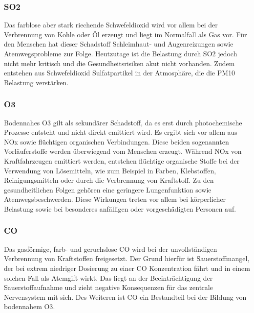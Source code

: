 \subsubsection{\acs{SO2}}
Das farblose aber stark riechende Schwefeldioxid wird vor allem bei der Verbrennung von Kohle oder Öl erzeugt und liegt im Normalfall als Gas vor. 
\newline
Für den Menschen hat dieser Schadstoff Schleimhaut- und Augenreizungen sowie Atemwegsprobleme zur Folge. 
\newline
Heutzutage ist die Belastung durch SO2 jedoch nicht mehr kritisch und die Gesundheitsrisiken akut nicht vorhanden.
\newline
Zudem entstehen aus Schwefeldioxid Sulfatpartikel in der Atmosphäre, die die PM10 Belastung verstärken. 

\subsubsection{\acs{O3}}
Bodennahes \acs{O3} gilt als sekundärer Schadstoff, da es erst durch photochemische Prozesse entsteht und nicht direkt emittiert wird. Es ergibt sich vor allem aus \acs{NOx} sowie flüchtigen organischen Verbindungen. Diese beiden sogenannten Vorläuferstoffe werden überwiegend vom Menschen erzeugt. Während \acs{NOx} von Kraftfahrzeugen emittiert werden, entstehen flüchtige organische Stoffe bei der Verwendung von Lösemitteln, wie zum Beispiel in Farben, Klebstoffen, Reinigungsmitteln oder durch die Verbrennung von Kraftstoff. 
\newline
Zu den gesundheitlichen Folgen gehören eine geringere Lungenfunktion sowie Atemwegsbeschwerden. Diese Wirkungen treten vor allem bei körperlicher Belastung sowie bei besonderes anfälligen oder vorgeschädigten Personen auf. 

\subsubsection{\acs{CO}}
Das gasförmige, farb- und geruchslose \acs{CO} wird bei der unvollständigen Verbrennung von Kraftstoffen freigesetzt. Der Grund hierfür ist Sauerstoffmangel, der bei extrem niedriger Dosierung zu einer \acs{CO} Konzentration fährt und in einem solchen Fall als Atemgift wirkt. Das liegt an der Beeinträchtigung der Sauerstoffaufnahme und zieht negative Konsequenzen für das zentrale Nervensystem mit sich. 
\newline
Des Weiteren ist \acs{CO} ein Bestandteil bei der Bildung von bodennahem \acs{O3}. 

